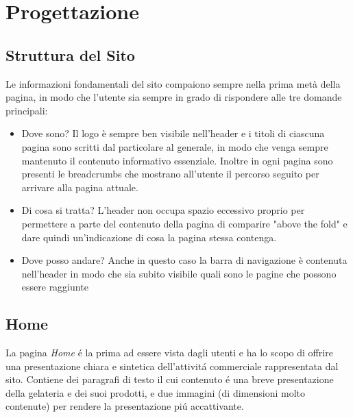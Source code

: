\section{Progettazione}
    \subsection{Struttura del Sito}
		Le informazioni fondamentali del sito compaiono sempre nella prima metà della pagina, in modo che l'utente sia sempre in grado di rispondere alle tre domande principali:
		\begin{itemize}
			\item Dove sono? Il logo è sempre ben visibile nell'header e i titoli di ciascuna pagina sono scritti dal particolare al generale, in modo che venga sempre mantenuto il contenuto informativo essenziale. Inoltre in ogni pagina sono presenti le breadcrumbs che mostrano all'utente il percorso seguito per arrivare alla pagina attuale.
			\item Di cosa si tratta? L'header non occupa spazio eccessivo proprio per permettere a parte del contenuto della pagina di comparire "above the fold" e dare quindi un'indicazione di cosa la pagina stessa contenga.
			\item Dove posso andare? Anche in questo caso la barra di navigazione è contenuta nell'header in modo che sia subito visibile quali sono le pagine che possono essere raggiunte
		\end{itemize}
    \subsection{Home}
		La pagina \emph{Home} \'e la prima ad essere vista dagli utenti e ha lo scopo di offrire una presentazione chiara e sintetica dell'attivit\'a commerciale rappresentata dal sito.
		Contiene dei paragrafi di testo il cui contenuto \'e una breve presentazione della gelateria e dei suoi prodotti, e due immagini (di dimensioni molto contenute) per rendere la presentazione pi\'u accattivante.
